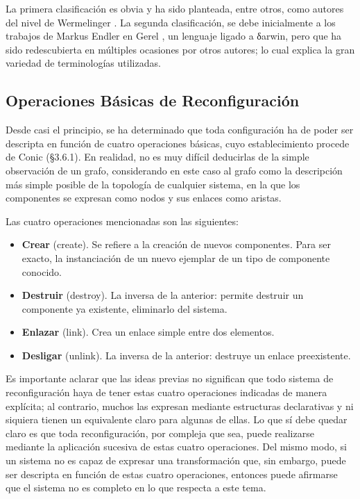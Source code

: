 La primera clasificación es obvia y ha sido planteada, entre otros, como autores del nivel de Wermelinger \cite{Wer99}. La segunda clasificación, se debe inicialmente a los trabajos de Markus Endler en Gerel \cite{EW92}, un lenguaje ligado a δarwin, pero que ha sido redescubierta en múltiples ocasiones por otros autores; lo cual explica la gran variedad de terminologías utilizadas.


\subsection{Operaciones Básicas de Reconfiguración}

Desde casi el principio, se ha determinado que toda configuración ha de poder
ser descripta en función de cuatro operaciones básicas, cuyo establecimiento
procede de Conic (§3.6.1). En realidad, no es muy difícil deducirlas de la
simple observación de un grafo, considerando en este caso al grafo como la
descripción más simple posible de la topología de cualquier sistema, en la
que los componentes se expresan como nodos y sus enlaces como aristas.

Las cuatro operaciones mencionadas son las siguientes:

\begin{itemize}

\item 
\textbf{Crear} (create). Se refiere a la creación de nuevos componentes.  Para ser
exacto, la instanciación de un nuevo ejemplar de un tipo de componente conocido. 

\item
\textbf{Destruir} (destroy). La inversa de la anterior: permite destruir un
componente ya
existente, eliminarlo del sistema.

\item
\textbf{Enlazar} (link). Crea un enlace simple entre dos elementos.

\item 
\textbf{Desligar} (unlink). La inversa de la anterior: destruye un enlace
preexistente.

\end{itemize}

Es importante aclarar que las ideas previas no significan que todo sistema de reconfiguración haya de tener estas cuatro operaciones indicadas de manera explícita; al contrario, muchos las expresan mediante estructuras declarativas y ni siquiera tienen un equivalente claro para algunas de ellas. Lo que sí debe quedar claro es que toda reconfiguración, por compleja que sea, puede realizarse  mediante la aplicación sucesiva de estas cuatro operaciones. Del mismo modo, si
un sistema no es capaz de expresar una transformación que, sin embargo, puede
ser descripta en función de estas cuatro operaciones, entonces puede afirmarse que el sistema no es completo en lo que respecta a este tema. 

